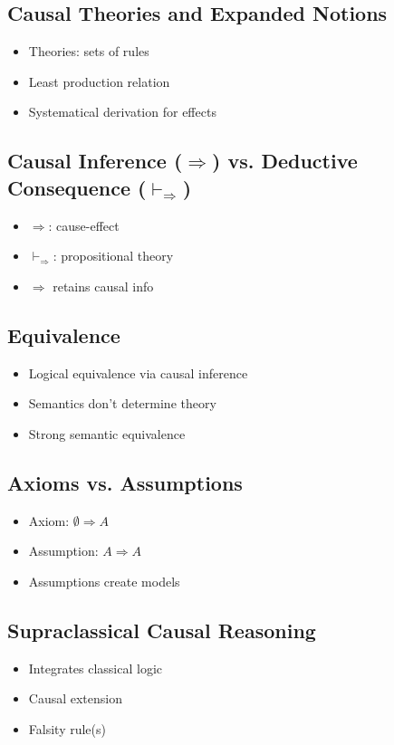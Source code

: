 \documentclass[seminar,palatino,english]{AIGpaper}
\begin{document}
\subsection{Causal Theories and Expanded Notions}
\begin{itemize}
    \item Theories: sets of rules
    \item Least production relation
    \item Systematical derivation for effects
\end{itemize}

\subsection{Causal Inference \texorpdfstring{(\( \Rightarrow \))}{} vs. Deductive Consequence \texorpdfstring{(\( \vdash_\Rightarrow \))}{}}
\begin{itemize}
    \item  \(\Rightarrow\): cause-effect
    \item \(\vdash_\Rightarrow\): propositional theory
    \item \(\Rightarrow\) retains causal info
\end{itemize}

\subsection{Equivalence}
\begin{itemize}
    \item Logical equivalence via causal inference
    \item Semantics don't determine theory
     \item Strong semantic equivalence
\end{itemize}

\subsection{Axioms vs. Assumptions}
\begin{itemize}
     \item Axiom: \(\emptyset \Rightarrow A\)
    \item Assumption: \(A \Rightarrow A\)
    \item Assumptions create models
\end{itemize}

\subsection{Supraclassical Causal Reasoning}
\begin{itemize}
    \item Integrates classical logic
    \item Causal extension
    \item Falsity rule(s)
\end{itemize}
\end{document}
